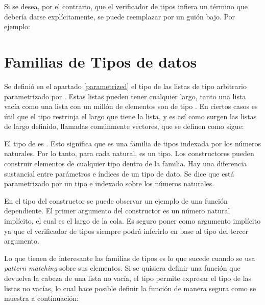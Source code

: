 Si se desea, por el contrario, que el verificador de tipos infiera un término que debería darse explícitamente, se puede reemplazar por un guión bajo. Por ejemplo:


\section{Familias de Tipos de datos}

Se definió en el apartado \ref{parametrized} el tipo de las listas de tipo arbitrario parametrizado por . Estas listas pueden tener cualquier largo, tanto una lista vacía como una lista con un millón de elementos son de tipo  . En ciertos casos es útil que el tipo restrinja el largo que tiene la lista, y es así como surgen las listas de largo definido, llamadas comúnmente vectores, que se definen como sigue:


El tipo de   es  \AgdaSymbol{$\rightarrow$} . Esto significa que   es una familia de tipos indexada por los números naturales. Por lo tanto, para cada  natural,   es un tipo. Los constructores pueden construir elementos de cualquier tipo dentro de la familia. Hay una diferencia sustancial entre parámetros e índices de un tipo de dato. Se dice que  está parametrizado por un tipo  e indexado sobre los números naturales. 

En el tipo del constructor \AgdaFunction{\_::\_} se puede observar un ejemplo de una función dependiente. El primer argumento del constructor es un número natural  implícito, el cual es el largo de la cola. Es seguro poner  como argumento implícito ya que el verificador de tipos siempre podrá inferirlo en base al tipo del tercer argumento. 

Lo que tienen de interesante las familias de tipos es lo que sucede cuando se usa \textit{pattern matching} sobre sus elementos. Si se quisiera definir una función que devuelva la cabeza de una lista no vacía, el tipo  permite expresar el tipo de las listas no vacías, lo cual hace posible definir la función  de manera segura como se muestra a continuación: 

